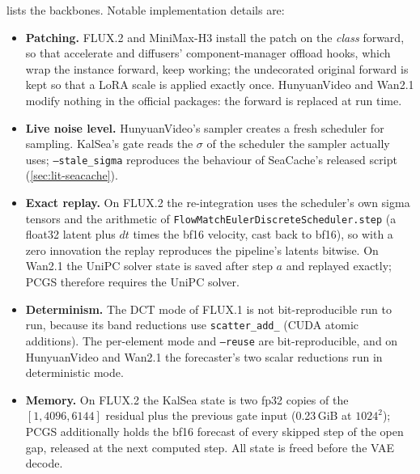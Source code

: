  lists the backbones. Notable implementation details are:
\begin{itemize}
  \item \textbf{Patching.} FLUX.2 and MiniMax-H3 install the patch on the \emph{class} forward, so that accelerate and diffusers' component-manager offload hooks, which wrap the instance forward, keep working; the undecorated original forward is kept so that a LoRA scale is applied exactly once. HunyuanVideo and Wan2.1 modify nothing in the official packages: the forward is replaced at run time.
  \item \textbf{Live noise level.} HunyuanVideo's sampler creates a fresh scheduler for sampling. KalSea's gate reads the $\sigma$ of the scheduler the sampler actually uses; \texttt{--stale\_sigma} reproduces the behaviour of SeaCache's released script (\cref{sec:lit-seacache}).
  \item \textbf{Exact replay.} On FLUX.2 the re-integration uses the scheduler's own sigma tensors and the arithmetic of \texttt{FlowMatchEulerDiscreteScheduler.step} (a float32 latent plus $dt$ times the bf16 velocity, cast back to bf16), so with a zero innovation the replay reproduces the pipeline's latents bitwise. On Wan2.1 the UniPC solver state is saved after step $a$ and replayed exactly; PCGS therefore requires the UniPC solver.
  \item \textbf{Determinism.} The DCT mode of FLUX.1 is not bit-reproducible run to run, because its band reductions use \texttt{scatter\_add\_} (CUDA atomic additions). The per-element mode and \texttt{--reuse} are bit-reproducible, and on HunyuanVideo and Wan2.1 the forecaster's two scalar reductions run in deterministic mode.
  \item \textbf{Memory.} On FLUX.2 the KalSea state is two fp32 copies of the $[1,4096,6144]$ residual plus the previous gate input (0.23\,GiB at $1024^2$); PCGS additionally holds the bf16 forecast of every skipped step of the open gap, released at the next computed step. All state is freed before the VAE decode.
\end{itemize}

